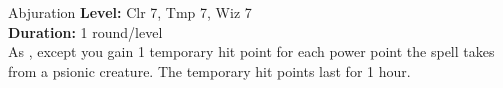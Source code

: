 {Abjuration}
{
	\textbf{Level:} Clr 7, Tmp 7, Wiz 7\\
	\textbf{Duration:} 1 round/level\\
}
{
	As , except you gain 1 temporary hit point for each power point the spell takes from a psionic creature. The temporary hit points last for 1 hour.
}